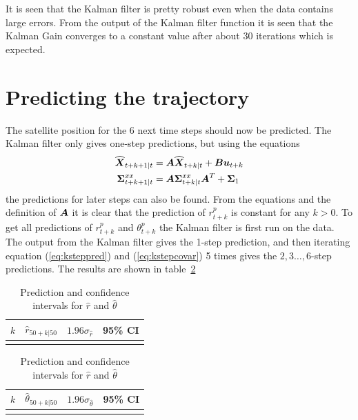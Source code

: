 It is seen that the Kalman filter is pretty robust even when the data contains large errors. From the output of the Kalman filter function it is seen that the Kalman Gain converges to a constant value after about 30 iterations which is expected.


\section*{Predicting the trajectory}
The satellite position for the 6 next time steps should now be predicted. The Kalman filter only gives one-step predictions, but using the equations
\begin{align}
    \widehat{\boldsymbol{X}}_{t+k+1|t} &= \boldsymbol{A}\widehat{\boldsymbol{X}}_{t+k|t} + \boldsymbol{B}\boldsymbol{u}_{t+k} \label{eq:ksteppred}\\
    \boldsymbol{\Sigma}^{xx}_{t+k+1|t} &= \boldsymbol{A}\boldsymbol{\Sigma}^{xx}_{t+k|t}\boldsymbol{A}^T + \boldsymbol{\Sigma}_1 \label{eq:kstepcovar}
\end{align}
the predictions for later steps can also be found. From the equations and the definition of $\boldsymbol{A}$ it is clear that the prediction of $r^p_{t+k}$ is constant for any $k>0$. To get all predictions of $r^p_{t+k}$ and $\theta^p_{t+k}$ the Kalman filter is first run on the data. The output from the Kalman filter gives the 1-step prediction, and then iterating equation (\ref{eq:ksteppred}) and (\ref{eq:kstepcovar}) 5 times gives the $2,3\dots,6$-step predictions. The results are shown in table~\ref{tbl:predictions}

\begin{table}
    \centering
    \begin{tabular}{lccc}
        $k$ & $\widehat{r}_{50+k|50}$ & $1.96\sigma_{\hat{r}}$ & 95\% CI \\\hline
        \\\hline
    \end{tabular}
    \hspace{0.5mm}
    \begin{tabular}{lccc}
        $k$ & $\widehat{\theta}_{50+k|50}$ & $1.96\sigma_{\hat{\theta}}$ & 95\% CI \\\hline
        \\\hline
    \end{tabular}
    \caption{Prediction and confidence intervals for $\widehat{r}$ and $\widehat{\theta}$}
    \label{tbl:predictions}
\end{table}

